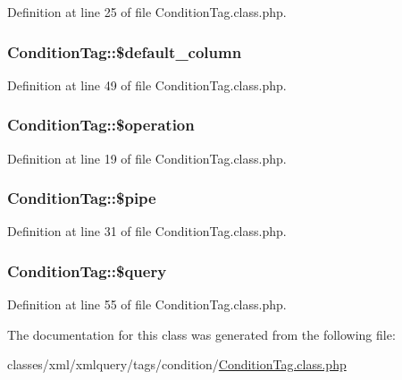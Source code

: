Definition at line 25 of file Condition\-Tag.\-class.\-php.

\hypertarget{classConditionTag_ac401b3684262dd2a0ff53ff9a97864fe}{
\subsubsection[{\$default\-\_\-column}]{\setlength{\rightskip}{0pt plus 5cm}Condition\-Tag\-::\$default\-\_\-column}}\label{classConditionTag_ac401b3684262dd2a0ff53ff9a97864fe}


Definition at line 49 of file Condition\-Tag.\-class.\-php.

\hypertarget{classConditionTag_a0f8be8743e1e43b334ee1b46d25fd02e}{
\subsubsection[{\$operation}]{\setlength{\rightskip}{0pt plus 5cm}Condition\-Tag\-::\$operation}}\label{classConditionTag_a0f8be8743e1e43b334ee1b46d25fd02e}


Definition at line 19 of file Condition\-Tag.\-class.\-php.

\hypertarget{classConditionTag_a52a8251ff965af25e284262fab02f7f5}{
\subsubsection[{\$pipe}]{\setlength{\rightskip}{0pt plus 5cm}Condition\-Tag\-::\$pipe}}\label{classConditionTag_a52a8251ff965af25e284262fab02f7f5}


Definition at line 31 of file Condition\-Tag.\-class.\-php.

\hypertarget{classConditionTag_ab186510e6366ad1033cc9d73cedf1f02}{
\subsubsection[{\$query}]{\setlength{\rightskip}{0pt plus 5cm}Condition\-Tag\-::\$query}}\label{classConditionTag_ab186510e6366ad1033cc9d73cedf1f02}


Definition at line 55 of file Condition\-Tag.\-class.\-php.



The documentation for this class was generated from the following file\-:\begin{DoxyCompactItemize}
\item 
classes/xml/xmlquery/tags/condition/\hyperlink{ConditionTag_8class_8php}{Condition\-Tag.\-class.\-php}\end{DoxyCompactItemize}
